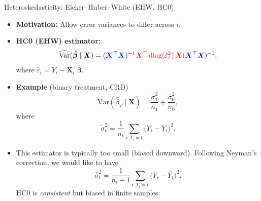\documentclass[10pt, handout]{beamer}
\theoremstyle{plain}
\newcommand{\bX}{\bm{X}}
\DeclareMathOperator{\diag}{diag}
\newcommand{\Var}{\mathrm{Var}}
\begin{document}
\begin{frame}{Heteroskedasticity: Eicker–Huber–White (EHW, HC0)}
\small
\begin{itemize}
  \item \textbf{Motivation:} Allow error variances to differ across $i$.
  \pause
  \vspace{0.5em}
  \item \textbf{HC0 (EHW) estimator:}
  \[
  \widehat{\Var}(\hat{\bm{\beta}} \mid \bX)
  = \color{blue}{(\bX^\top \bX)^{-1}}
    \color{red}{\bX^\top \diag(\hat{\varepsilon}_i^2)\,\bX}
    \color{blue}{(\bX^\top \bX)^{-1}},
  \]
  where $\hat{\varepsilon}_i = Y_i - \bX_i^\top \hat{\bm{\beta}}$.
  \pause
  \vspace{1em}

  \item \textbf{Example} (binary treatment, CRD)
  \[
  \Var(\hat{\beta}_T \mid \bX)
  = \frac{\tilde{\sigma}_1^2}{n_1} + \frac{\tilde{\sigma}_0^2}{n_0},
  \]
  where
  \[
  \tilde{\sigma}_t^2 = \frac{1}{n_t}\sum_{i:T_i=t}\big(Y_i-\overline{Y}_t\big)^2.
  \]
  \pause
  \vspace{0.5em}
  \item This estimator is typically too small (biased downward).  
  \pause
  \vspace{0.3em}
  Following Neyman’s correction, we would like to have
  \[
  \hat{\sigma}_t^2
  = \frac{1}{n_t-1}\sum_{i:T_i=t}\big(Y_i-\overline{Y}_t\big)^2.
  \]
  \pause
  \vspace{0.3em}
  HC0 is \emph{consistent} but biased in finite samples.
\end{itemize}
\end{frame}
\end{document}
